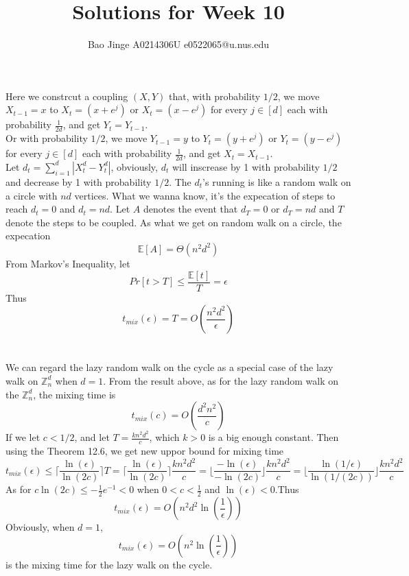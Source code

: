 \documentclass{article}
\author{Bao Jinge A0214306U e0522065@u.nus.edu}
\title{Solutions for Week 10}
\date{}
\begin{document}
	\maketitle
	\section{}
	Here we constrcut a coupling $(X, Y)$ that, with probability $1/2$, we move $X_{t-1}=x$ to $X_{t}=(x+e^j)$ or $X_{t}=(x-e^j)$ for every $j \in [d]$ each with probability $\frac{1}{2d}$, and get $Y_{t} = Y_{t-1}$.\\
	Or with probability $1/2$, we move $Y_{t-1}=y$ to $Y_{t}=(y+e^j)$ or $Y_{t}=(y-e^j)$ for every $j \in [d]$ each with probability $\frac{1}{2d}$, and get $X_{t} = X_{t-1}$.\\
	Let $d_t=\sum_{i=1}^d|X_t^d-Y_t^d|$, obviously, $d_t$ will inscrease by 1 with probability $1/2$ and decrease by 1 with probability $1/2$. The $d_t$'s running is like a random walk on a circle with $nd$ vertices.
	What we wanna know, it's the expecation of steps to reach $d_t=0$ and $d_t=nd$.
	Let $A$ denotes the event that $d_T=0$ or $d_T=nd$ and $T$ denote the steps to be coupled.
	As what we get on random walk on a circle, the expecation 
	$$
	\mathbb{E}[A] = \Theta(n^2d^2)
	$$
	From Markov's Inequality, let
	$$
	Pr[t>T] \leq \frac{\mathbb{E}[t]}{T}= \epsilon
	$$
	Thus 
	$$
	t_{mix}(\epsilon) = T = O(\frac{n^2d^2}{\epsilon})
	$$

	\section{}
	We can regard the lazy random walk on the cycle as a special case of the lazy walk on $\mathbb{Z}^d_n$ when $d=1$.
	From the result above, as for the lazy random walk on the $\mathbb{Z}^d_n$, the mixing time is
	$$
	t_{mix}(c) = O(\frac{d^2n^2}{c})
	$$
	If we let $c<1/2$, and let $T=\frac{kn^2d^2}{c}$, which $k>0$ is a big enough constant.
	Then using the Theorem 12.6, we get new uppor bound for mixing time
	$$
	t_{mix}(\epsilon) \leq \lceil\frac{\ln(\epsilon)}{\ln(2c)}\rceil T= \lceil\frac{\ln(\epsilon)}{\ln(2c)}\rceil\frac{kn^2d^2}{c}= \lfloor\frac{-\ln(\epsilon)}{-\ln(2c)}\rfloor\frac{kn^2d^2}{c} = \lfloor\frac{\ln(1/\epsilon)}{\ln(1/(2c))}\rfloor\frac{kn^2d^2}{c}
	$$
	As for $c\ln(2c) \leq -\frac{1}{2}e^{-1} < 0$ when $0 < c < \frac{1}{2}$ and $\ln(\epsilon) < 0$.Thus
	$$
	t_{mix}(\epsilon)=O(n^2d^2\ln(\frac{1}{\epsilon}))
	$$
	Obviously, when $d=1$,
	$$
	t_{mix}(\epsilon)=O(n^2\ln(\frac{1}{\epsilon}))
	$$
	is the mixing time for the lazy walk on the cycle.
\end{document}
